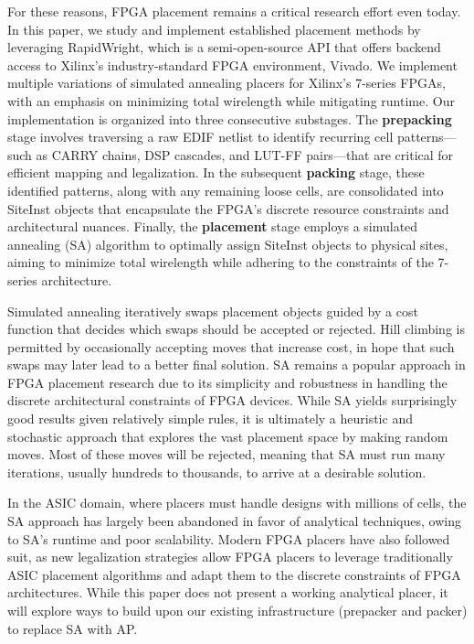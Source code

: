 \documentclass[twocolumn]{article}
\begin{document}
    For these reasons, FPGA placement remains a critical research effort even today. 
    In this paper, we study and implement established placement methods by leveraging RapidWright, which is a semi-open-source API that offers backend access to Xilinx's industry-standard FPGA environment, Vivado. 
    We implement multiple variations of simulated annealing placers for Xilinx's 7-series FPGAs, with an emphasis on minimizing total wirelength while mitigating runtime. 
    Our implementation is organized into three consecutive substages. 
    The \textbf{prepacking} stage involves traversing a raw EDIF netlist to identify recurring cell patterns—such as CARRY chains, DSP cascades, and LUT-FF pairs—that are critical for efficient mapping and legalization. 
    In the subsequent \textbf{packing} stage, these identified patterns, along with any remaining loose cells, are consolidated into SiteInst objects that encapsulate the FPGA’s discrete resource constraints and architectural nuances. 
    Finally, the \textbf{placement} stage employs a simulated annealing (SA) algorithm to optimally assign SiteInst objects to physical sites, aiming to minimize total wirelength while adhering to the constraints of the 7-series architecture. 

    Simulated annealing iteratively swaps placement objects guided by a cost function that decides which swaps should be accepted or rejected. 
    Hill climbing is permitted by occasionally accepting moves that increase cost, in hope that such swaps may later lead to a better final solution. 
    SA remains a popular approach in FPGA placement research due to its simplicity and robustness in handling the discrete architectural constraints of FPGA devices. 
    While SA yields surprisingly good results given relatively simple rules, it is ultimately a heuristic and stochastic approach that explores the vast placement space by making random moves. 
    Most of these moves will be rejected, meaning that SA must run many iterations, usually hundreds to thousands, to arrive at a desirable solution.

    In the ASIC domain, where placers must handle designs with millions of cells, the SA approach has largely been abandoned in favor of analytical techniques, owing to SA's runtime and poor scalability. Modern FPGA placers have also followed suit, as new legalization strategies allow FPGA placers to leverage traditionally ASIC placement algorithms and adapt them to the discrete constraints of FPGA architectures. 
    While this paper does not present a working analytical placer, it will explore ways to build upon our existing infrastructure (prepacker and packer) to replace SA with AP.
\end{document}
